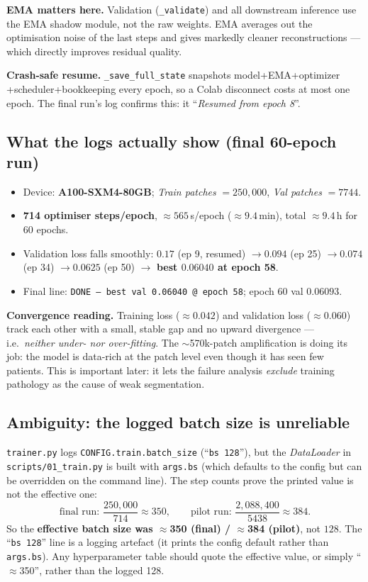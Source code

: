 \documentclass[11pt,a4paper]{article}
\newcommand{\code}[1]{\texttt{\small #1}}
\begin{document}
\textbf{EMA matters here.} Validation (\code{\_validate}) and all downstream
inference use the EMA shadow module, not the raw weights. EMA averages out the
optimisation noise of the last steps and gives markedly cleaner reconstructions
--- which directly improves residual quality.

\textbf{Crash-safe resume.} \code{\_save\_full\_state} snapshots model+EMA+optimizer
+scheduler+bookkeeping every epoch, so a Colab disconnect costs at most one
epoch. The final run's log confirms this: it ``\emph{Resumed from epoch 8}''.

\subsection{What the logs actually show (final 60-epoch run)}
\begin{itemize}[leftmargin=1.4em,itemsep=1pt]
\item Device: \textbf{A100-SXM4-80GB}; \emph{Train patches} $=250{,}000$,
\emph{Val patches} $=7744$.
\item \textbf{714 optimiser steps/epoch}, $\approx565$\,s/epoch
($\approx9.4$\,min), total $\approx9.4$\,h for 60 epochs.
\item Validation loss falls smoothly: $0.17$ (ep 9, resumed) $\to 0.094$ (ep 25)
$\to 0.074$ (ep 34) $\to 0.0625$ (ep 50) $\to$ \textbf{best $0.06040$ at epoch 58}.
\item Final line: \code{DONE — best val 0.06040 @ epoch 58}; epoch 60 val
$0.06093$.
\end{itemize}

\textbf{Convergence reading.} Training loss ($\approx0.042$) and validation loss
($\approx0.060$) track each other with a small, stable gap and no upward
divergence --- i.e.\ \emph{neither under- nor over-fitting}. The $\sim$570k-patch
amplification is doing its job: the model is data-rich at the patch level even
though it has seen few patients. This is important later: it lets the failure
analysis \emph{exclude} training pathology as the cause of weak segmentation.

\subsection{Ambiguity: the logged batch size is unreliable}
\code{trainer.py} logs \code{CONFIG.train.batch\_size} (``\code{bs 128}''), but the
\emph{DataLoader} in \code{scripts/01\_train.py} is built with \code{args.bs}
(which defaults to the config but can be overridden on the command line). The
step counts prove the printed value is not the effective one:
\[
\text{final run: } \frac{250{,}000}{714}\approx 350,
\qquad
\text{pilot run: } \frac{2{,}088{,}400}{5438}\approx 384 .
\]
So the \textbf{effective batch size was $\approx$350 (final) / $\approx$384
(pilot)}, not $128$. The ``\code{bs 128}'' line is a logging artefact (it prints
the config default rather than \code{args.bs}). Any hyperparameter table should
quote the effective value, or simply ``$\approx$350'', rather than the logged
128.
\end{document}
